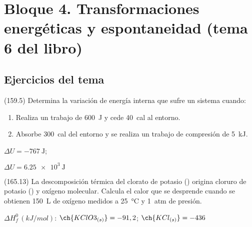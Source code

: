 \section{Bloque 4. Transformaciones energéticas y espontaneidad (tema 6 del libro)}

\subsection*{Ejercicios del tema}

  \begin{exercise}[
      tags    = {},
      topics  = {química, termodinámica, termoquímica},
      source  = {FQ 1B MGH 2016, p159, e5},
    ]
    (159.5) Determina la variación de energía interna que sufre un sistema
    cuando:
    \begin{enumerate}
      \item Realiza un trabajo de \SI{600}{\joule} y cede \SI{40}{cal} al entorno.
      \item Absorbe \SI{300}{cal} del entorno y se realiza un trabajo de compresión de \SI{5}{\kilo\joule}.
    \end{enumerate}
  \end{exercise}

  \begin{solution}
    \begin{enumerate*}
      \item \( \Delta U = \SI{-767}{\joule} \); \item \( \Delta U = \SI{6.25e3}{\joule} \)
    \end{enumerate*}
  \end{solution}




  \begin{exercise}[
      tags    = {},
      topics  = {química, termodinámica, termoquímica},
      source  = {FQ 1B MGH 2016, p165, e13},
    ]
    (165.13) La descomposición térmica del clorato de potasio ()
    origina cloruro de potasio () y oxígeno molecular. Calcula
    el calor que se desprende cuando se obtienen \SI{150}{\liter} de
    oxígeno medidos a \SI{25}{\celsius} y \SI{1}{atm} de presión.

    \begin{gexdatos}
      \( \Delta H^0_f\,(\si{kJ/mol}) \): \( \ch{KClO3_{(s)}} = -91,2 \); \( \ch{KCl_{(s)}} = -436 \)
    \end{gexdatos}
  \end{exercise}

